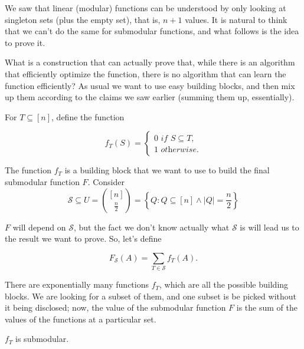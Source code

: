 We saw that linear (modular) functions can be understood by only looking at singleton sets (plus the empty set), that is, $n + 1$ values. It is natural to think that we can't do the same for submodular functions, and what follows is the idea to prove it.

What is a construction that can actually prove that, while there is an algorithm that efficiently optimize the function, there is no algorithm that can learn the function efficiently? As usual we want to use easy building blocks, and then mix up them according to the claims we saw earlier (summing them up, essentially). 

For $T \subseteq [n]$, define the function

\begin{equation}
f_T(S)=\begin{cases}
	0 \textit{ if } S\subseteq T,\\
	1 \textit{ otherwise}.
\end{cases}
\end{equation}

The function $f_T$ is a building block that we want to use to build the final submodular function $F$. Consider 
\[\mathcal{S} \subseteq U = \binom{[n]}{\frac{n}{2}} = \left\{ Q : Q\subseteq [n] \wedge |Q| = \frac{n}{2}\right\}\]

$F$ will depend on $\mathcal{S}$, but the fact we don't know actually what $\mathcal{S}$ is will lead us to the result we want to prove. So, let's define

\begin{equation}
	F_{\mathcal{S}}(A) = \sum_{T \in \mathcal{S}}f_T(A).
\end{equation}

There are exponentially many functions $f_T$, which are all the possible building blocks. We are looking for a subset of them, and one subset is be picked without it being disclosed; now, the value of the submodular function $F$ is the sum of the values of the functions at a particular set.

\begin{claim}
	$f_T$ is submodular.
\end{claim}

